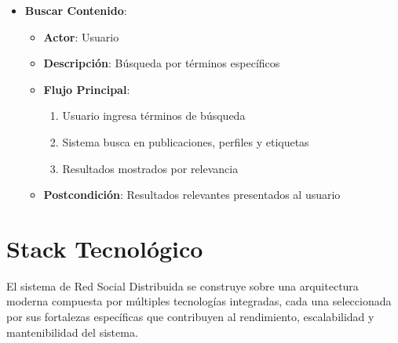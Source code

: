 \documentclass[12pt,letterpaper]{article}
\begin{document}
\begin{itemize}
    \item \textbf{Buscar Contenido}:
    \begin{itemize}
        \item \textbf{Actor}: Usuario
        \item \textbf{Descripción}: Búsqueda por términos específicos
        \item \textbf{Flujo Principal}:
        \begin{enumerate}
            \item Usuario ingresa términos de búsqueda
            \item Sistema busca en publicaciones, perfiles y etiquetas
            \item Resultados mostrados por relevancia
        \end{enumerate}
        \item \textbf{Postcondición}: Resultados relevantes presentados al usuario
    \end{itemize}
\end{itemize}

\section{Stack Tecnológico}
El sistema de Red Social Distribuida se construye sobre una arquitectura moderna compuesta por múltiples tecnologías integradas, cada una seleccionada por sus fortalezas específicas que contribuyen al rendimiento, escalabilidad y mantenibilidad del sistema.
\end{document}
